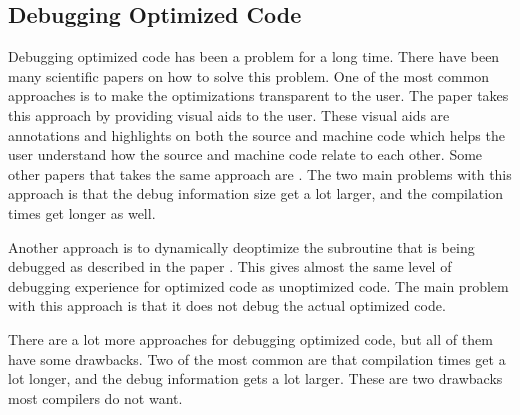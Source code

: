 


\subsection{Debugging Optimized Code}


Debugging optimized code has been a problem for a long time.
There have been many scientific papers on how to solve this problem.
One of the most common approaches is to make the optimizations transparent to the user.
The paper \cite{edselc.2-52.0-8497669319919920107} takes this approach by providing visual aids to the user.
These visual aids are annotations and highlights on both the source and machine code which helps the user understand how the source and machine code relate to each other.
Some other papers that takes the same  approach are \cite{adl1996source, edselc.2-52.0-002842706219940105}.
The two main problems with this approach is that the debug information size get a lot larger, and the compilation times get longer as well.


Another approach is to dynamically deoptimize the subroutine that is being debugged as described in the paper \cite{edselc.2-52.0-002699386519920107}.
This gives almost the same level of debugging experience for optimized code as unoptimized code.
The main problem with this approach is that it does not debug the actual optimized code.


There are a lot more approaches for debugging optimized code, but all of them have some drawbacks.
Two of the most common are that compilation times get a lot longer, and the debug information gets a lot larger.
These are two drawbacks most compilers do not want.



